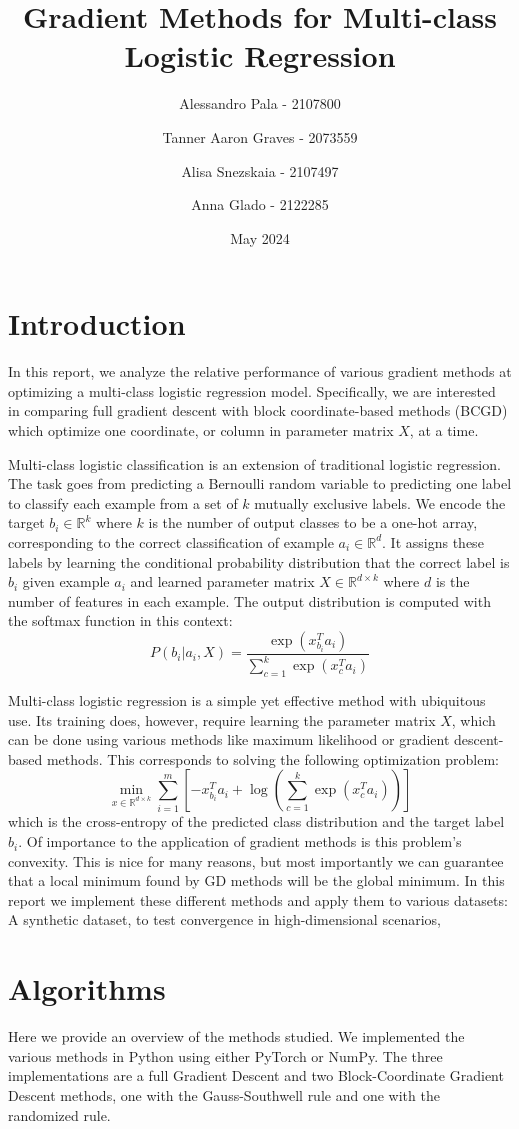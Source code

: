 \documentclass{article}
\title{Gradient Methods for Multi-class Logistic Regression}
\author{Alessandro Pala - 2107800 \and 
Tanner Aaron Graves - 2073559 \and 
Alisa Snezskaia - 2107497 \and
Anna Glado - 2122285}
\date{May 2024}
\begin{document}
\maketitle

\section{Introduction}
In this report, we analyze the relative performance of various gradient methods at optimizing a multi-class logistic regression model. Specifically, we are interested in comparing full gradient descent with block coordinate-based methods (BCGD) which optimize one coordinate, or column in parameter matrix $X$, at a time. 

Multi-class logistic classification is an extension of traditional logistic regression. The task goes from predicting a Bernoulli random variable to predicting one label to classify each example from a set of $k$ mutually exclusive labels. We encode the target $b_i \in \mathbb{R}^k$ where $k$ is the number of output classes to be a one-hot array, corresponding to the correct classification of example $a_i \in \mathbb{R}^d$. It assigns these labels by learning the conditional probability distribution that the correct label is $b_i$ given example $a_i$ and learned parameter matrix $X \in \mathbb{R}^{d \times k}$ where $d$ is the number of features in each example. The output distribution is computed with the softmax function in this context: 
$$P(b_i|a_i, X) = \frac{\exp(x_{b_i}^T a_i)}{\sum_{c=1}^k\exp(x_c^T a_i)}$$

Multi-class logistic regression is a simple yet effective method with ubiquitous use. Its training does, however, require learning the parameter matrix $X$, which can be done using various methods like maximum likelihood or gradient descent-based methods. This corresponds to solving the following optimization problem:
$$\min_{x \in \mathbb{R}^{d \times k}} \sum\limits_{i=1}^{m}[-x^T_{b_i}a_i + \log(\sum\limits_{c=1}^k\exp(x_c^T a_i))]$$
which is the cross-entropy of the predicted class distribution and the target label $b_i$. Of importance to the application of gradient methods is this problem's convexity. This is nice for many reasons, but most importantly we can guarantee that a local minimum found by GD methods will be the global minimum.  
In this report we implement these different methods and apply them to various datasets: A synthetic dataset, to test convergence in high-dimensional scenarios, 

\section{Algorithms}
Here we provide an overview of the methods studied. We implemented the various methods in Python using either PyTorch or NumPy. The three implementations are a full Gradient Descent and two Block-Coordinate Gradient Descent methods, one with the Gauss-Southwell rule and one with the randomized rule.  
\end{document}
